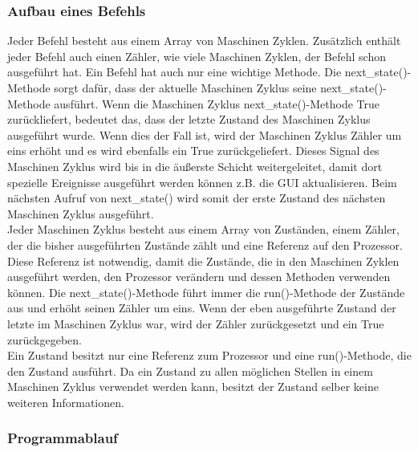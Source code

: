 \documentclass[12pt]{article}
\begin{document}
\subsubsection{Aufbau eines Befehls}

Jeder Befehl besteht aus einem Array von Maschinen Zyklen. Zusätzlich enthält jeder Befehl auch einen Zähler, wie viele Maschinen Zyklen, der Befehl schon ausgeführt hat. Ein Befehl hat auch nur eine wichtige Methode. Die next\_state()-Methode sorgt dafür, dass der aktuelle Maschinen Zyklus seine next\_state()-Methode ausführt. Wenn die Maschinen Zyklus next\_state()-Methode True zurückliefert, bedeutet das, dass der letzte Zustand des Maschinen Zyklus ausgeführt wurde. Wenn dies der Fall ist, wird der Maschinen Zyklus Zähler um eins erhöht und es wird ebenfalls ein True zurückgeliefert. Dieses Signal des Maschinen Zyklus wird bis in die äußerste Schicht weitergeleitet, damit dort spezielle Ereignisse ausgeführt werden können z.B. die GUI aktualisieren. Beim nächsten Aufruf von next\_state() wird somit der erste Zustand des nächsten Maschinen Zyklus ausgeführt.
\\

\noindent
Jeder Maschinen Zyklus besteht aus einem Array von Zuständen, einem Zähler, der die bisher ausgeführten Zustände zählt und eine Referenz auf den Prozessor. Diese Referenz ist notwendig, damit die Zustände, die in den Maschinen Zyklen ausgeführt werden, den Prozessor verändern und dessen Methoden verwenden können. Die next\_state()-Methode führt immer die run()-Methode der Zustände aus und erhöht seinen Zähler um eins. Wenn der eben ausgeführte Zustand der letzte im Maschinen Zyklus war, wird der Zähler zurückgesetzt und ein True zurückgegeben.
\\

\noindent
Ein Zustand besitzt nur eine Referenz zum Prozessor und eine run()-Methode, die den Zustand ausführt. Da ein Zustand zu allen möglichen Stellen in einem Maschinen Zyklus verwendet werden kann, besitzt der Zustand selber keine weiteren Informationen.


\subsubsection{Programmablauf}
\end{document}
